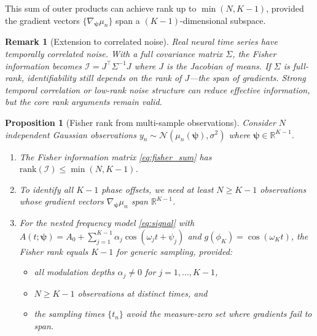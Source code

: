 \documentclass[12pt]{article}
\newtheorem{proposition}[theorem]{Proposition}
\newtheorem{remark}[theorem]{Remark}
\newcommand{\R}{\mathbb{R}}
\newcommand{\FIM}{\mathcal{I}}
\begin{document}
This sum of outer products can achieve rank up to $\min(N, K-1)$, provided the gradient vectors $\{\nabla_{\bm{\psi}} \mu_n\}$ span a $(K-1)$-dimensional subspace.

\begin{remark}[Extension to correlated noise]
Real neural time series have temporally correlated noise. With a full covariance matrix $\Sigma$, the Fisher information becomes $\FIM = J^\top \Sigma^{-1} J$ where $J$ is the Jacobian of means. If $\Sigma$ is full-rank, identifiability still depends on the rank of $J$---the span of gradients. Strong temporal correlation or low-rank noise structure can reduce effective information, but the core rank arguments remain valid.
\end{remark}

\begin{proposition}[Fisher rank from multi-sample observations]
\label{prop:rank}
Consider $N$ independent Gaussian observations $y_n \sim \mathcal{N}(\mu_n(\bm{\psi}), \sigma^2)$ where $\bm{\psi} \in \R^{K-1}$.
\begin{enumerate}
    \item[(i)] The Fisher information matrix \eqref{eq:fisher_sum} has $\mathrm{rank}(\FIM) \leq \min(N, K-1)$.
    \item[(ii)] To identify all $K-1$ phase offsets, we need at least $N \geq K-1$ observations whose gradient vectors $\nabla_{\bm{\psi}} \mu_n$ span $\R^{K-1}$.
    \item[(iii)] For the nested frequency model \eqref{eq:signal} with $A(t; \bm{\psi}) = A_0 + \sum_{j=1}^{K-1}\alpha_j \cos(\omega_j t + \psi_j)$ and $g(\phi_K) = \cos(\omega_K t)$, the Fisher rank equals $K-1$ for generic sampling, provided:
    \begin{itemize}
        \item all modulation depths $\alpha_j \neq 0$ for $j = 1, \ldots, K-1$,
        \item $N \geq K-1$ observations at distinct times, and
        \item the sampling times $\{t_n\}$ avoid the measure-zero set where gradients fail to span.
    \end{itemize}
\end{enumerate}
\end{proposition}
\end{document}
